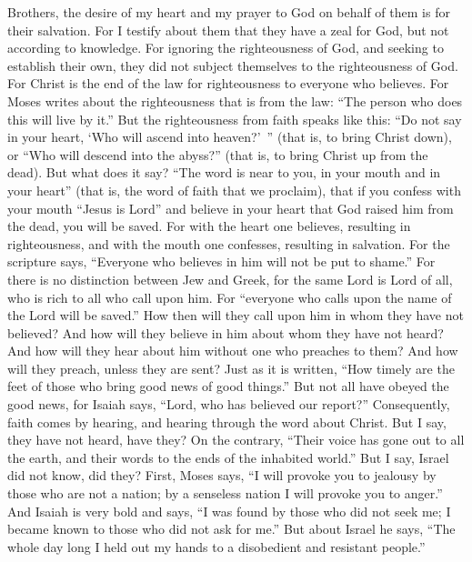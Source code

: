 \begin{biblechapter} %
 Brothers, the desire of my heart and my prayer to God on behalf of them is for their salvation.
\verse For I testify about them that they have a zeal for God, but not according to knowledge.
\verse For ignoring the righteousness of God, and seeking to establish their own, they did not subject themselves to the righteousness of God.
\verse For Christ is the end of the law for righteousness to everyone who believes.
\verse For Moses writes about the righteousness that is from the law: “The person who does this will live by it.”
\verse But the righteousness from faith speaks like this: “Do not say in your heart, ‘Who will ascend into heaven?’ ” (that is, to bring Christ down),
\verse or “Who will descend into the abyss?” (that is, to bring Christ up from the dead).
\verse But what does it say? “The word is near to you, in your mouth and in your heart” (that is, the word of faith that we proclaim),
\verse that if you confess with your mouth “Jesus is Lord” and believe in your heart that God raised him from the dead, you will be saved.
\verse For with the heart one believes, resulting in righteousness, and with the mouth one confesses, resulting in salvation.
\verse For the scripture says, “Everyone who believes in him will not be put to shame.”
\verse For there is no distinction between Jew and Greek, for the same Lord is Lord of all, who is rich to all who call upon him.
\verse For “everyone who calls upon the name of the Lord will be saved.”
\verse How then will they call upon him in whom they have not believed? And how will they believe in him about whom they have not heard? And how will they hear about him without one who preaches to them?
\verse And how will they preach, unless they are sent? Just as it is written, “How timely are the feet of those who bring good news of good things.”
\verse But not all have obeyed the good news, for Isaiah says, “Lord, who has believed our report?”
\verse Consequently, faith comes by hearing, and hearing through the word about Christ.
\verse But I say, they have not heard, have they? On the contrary, “Their voice has gone out to all the earth, 
and their words to the ends of the inhabited world.”
\verse But I say, Israel did not know, did they? First, Moses says, “I will provoke you to jealousy by those who are not a nation; 
by a senseless nation I will provoke you to anger.”
\verse And Isaiah is very bold and says, “I was found by those who did not seek me; 
I became known to those who did not ask for me.”
\verse But about Israel he says, “The whole day long I held out my hands 
to a disobedient and resistant people.”
\end{biblechapter}

